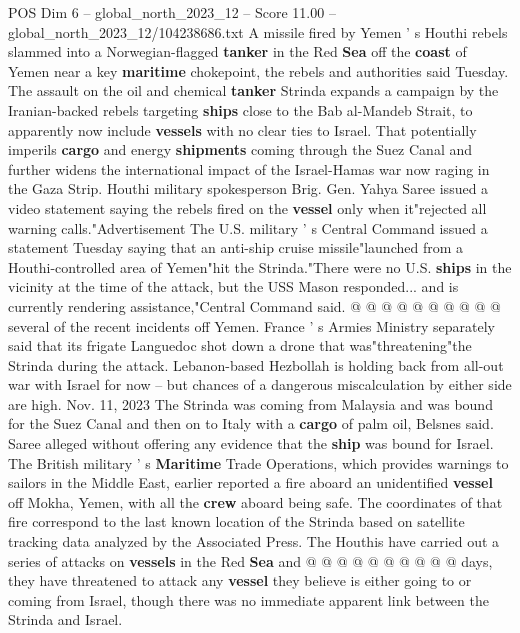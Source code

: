 \begin{textsample}{POS Dim 6 – global\_north\_2023\_12 – Score 11.00 – global\_north\_2023\_12/104238686.txt}  \label{ex:f6_pos_133}
A missile fired by Yemen ' s Houthi rebels slammed into a Norwegian-flagged \textbf{tanker} in the Red \textbf{Sea} off the \textbf{coast} of Yemen near a key \textbf{maritime} chokepoint, the rebels and authorities said Tuesday.
The assault on the oil and chemical \textbf{tanker} Strinda expands a campaign by the Iranian-backed rebels targeting \textbf{ships} close to the Bab al-Mandeb Strait, to apparently now include \textbf{vessels} with no clear ties to Israel.
That potentially imperils \textbf{cargo} and energy \textbf{shipments} coming through the Suez Canal and further widens the international impact of the Israel-Hamas war now raging in the Gaza Strip.
Houthi military spokesperson Brig.
Gen.
Yahya Saree issued a video statement saying the rebels fired on the \textbf{vessel} only when it"rejected all warning calls."Advertisement The U.S. military ' s Central Command issued a statement Tuesday saying that an anti-ship cruise missile"launched from a Houthi-controlled area of Yemen"hit the Strinda."There were no U.S. \textbf{ships} in the vicinity at the time of the attack, but the USS Mason responded... and is currently rendering assistance,"Central Command said. @ @ @ @ @ @ @ @ @ @ several of the recent incidents off Yemen.
France ' s Armies Ministry separately said that its frigate Languedoc shot down a drone that was"threatening"the Strinda during the attack.
Lebanon-based Hezbollah is holding back from all-out war with Israel for now -- but chances of a dangerous miscalculation by either side are high.
Nov. 11, 2023 The Strinda was coming from Malaysia and was bound for the Suez Canal and then on to Italy with a \textbf{cargo} of palm oil, Belsnes said.
Saree alleged without offering any evidence that the \textbf{ship} was bound for Israel.
The British military ' s \textbf{Maritime} Trade Operations, which provides warnings to sailors in the Middle East, earlier reported a fire aboard an unidentified \textbf{vessel} off Mokha, Yemen, with all the \textbf{crew} aboard being safe.
The coordinates of that fire correspond to the last known location of the Strinda based on satellite tracking data analyzed by the Associated Press.
The Houthis have carried out a series of attacks on \textbf{vessels} in the Red \textbf{Sea} and @ @ @ @ @ @ @ @ @ @ days, they have threatened to attack any \textbf{vessel} they believe is either going to or coming from Israel, though there was no immediate apparent link between the Strinda and Israel.

\end{textsample}
